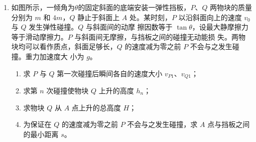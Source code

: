 \begin{enumerate}





\newpage
\item
如图所示，一倾角为$ \theta $的固定斜面的底端安装一弹性挡板，$ P $、$ Q $ 两物块的质量分别为 $ m $ 和
$ 4m $，$ Q $ 静止于斜面上 $ A $ 处。某时刻，$ P $ 以沿斜面向上的速度 $ v_{0} $ 与 $ Q $ 发生弹性碰撞。$ Q $ 与斜面间的动摩
擦因数等于 $ \tan \theta $，设最大静摩擦力等于滑动摩擦力。$ P $ 与斜面间无摩擦，与挡板之间的碰撞无动能损
失。两物块均可以看作质点，斜面足够长，$ Q $ 的速度减为零之前 $ P $ 不会与之发生碰撞。重力加速度大
小为 $ g $。
\begin{enumerate}
\item
求 $ P $ 与 $ Q $ 第一次碰撞后瞬间各自的速度大小 $ v _{P1} $、$ v _{Q1} $；
\item 
求第 $ n $ 次碰撞使物块 $ Q $ 上升的高度 $ h_n $；
\item 
求物块 $ Q $ 从 $ A $ 点上升的总高度 $ H $；
\item 
为保证在 $ Q $ 的速度减为零之前 $ P $ 不会与之发生碰撞，求 $ A $ 点与挡板之间的最小距离 $ s $。
\end{enumerate}
\begin{figure}[h!]
\flushright

\end{figure}


\end{enumerate}
